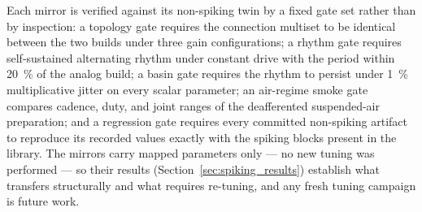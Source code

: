 Each mirror is verified against its non-spiking twin by a fixed gate set rather than by inspection: a topology gate requires the connection multiset to be identical between the two builds under three gain configurations; a rhythm gate requires self-sustained alternating rhythm under constant drive with the period within \qty{20}{\percent} of the analog build; a basin gate requires the rhythm to persist under \qty{1}{\percent} multiplicative jitter on every scalar parameter; an air-regime smoke gate compares cadence, duty, and joint ranges of the deafferented suspended-air preparation; and a regression gate requires every committed non-spiking artifact to reproduce its recorded values exactly with the spiking blocks present in the library. The mirrors carry mapped parameters only --- no new tuning was performed --- so their results (Section~\ref{sec:spiking_results}) establish what transfers structurally and what requires re-tuning, and any fresh tuning campaign is future work.
